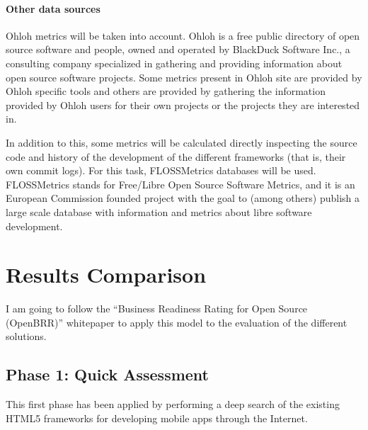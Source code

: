 \documentclass[a4paper,12pt]{book}
\begin{document}
\subsubsection{Other data sources}
Ohloh metrics will be taken into account. Ohloh\cite{Ohloh} is a free public
directory of open source software and people, owned and operated by BlackDuck
Software Inc., a consulting company specialized in gathering and providing
information about open source software projects. Some metrics present in Ohloh
site are provided by Ohloh specific tools and others are provided by gathering
the information provided by Ohloh users for their own projects or the projects
they are interested in.

In addition to this, some metrics will be calculated directly inspecting the
source code and history of the development of the different frameworks (that is, their own commit logs). For this task, FLOSSMetrics databases will be used.
FLOSSMetrics\cite{FLOSSMetrics} stands for Free/Libre Open Source Software
Metrics, and it is an European Commission founded project with the goal to
(among others) publish a large scale database with information and metrics about libre software development. 


\chapter{Results Comparison}
\label{chap:results}

I am going to follow the ``Business Readiness Rating for Open Source
(OpenBRR)'' whitepaper\cite{OpenBRRWhitepaper} to apply this model to the
evaluation of the different solutions.

\section{Phase 1: Quick Assessment}
\label{sec:phase1}
This first phase has been applied by performing a deep search of the existing HTML5 frameworks for developing mobile apps through the Internet.


\end{document}
